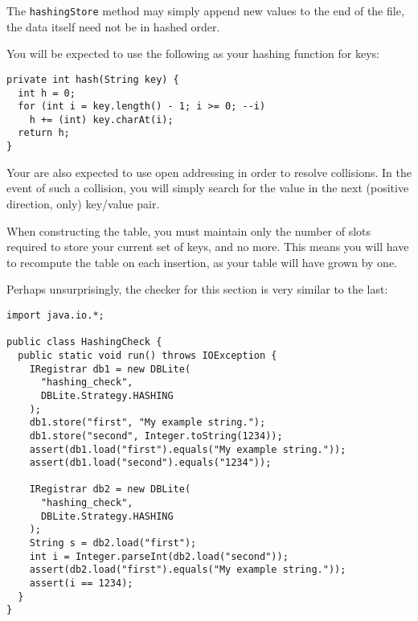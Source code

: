 \documentclass{article}
\begin{document}
The \texttt{hashingStore} method may simply append new values to the end of the
file, the data itself need not be in hashed order.

You will be expected to use the following as your hashing function for keys:

\begin{verbatim}
private int hash(String key) {
  int h = 0;
  for (int i = key.length() - 1; i >= 0; --i)
    h += (int) key.charAt(i);
  return h;
}
\end{verbatim}

Your are also expected to use open addressing in order to resolve collisions.
In the event of such a collision, you will simply search for the value in the
next (positive direction, only) key/value pair.

When constructing the table, you must maintain only the number of slots
required to store your current set of keys, and no more.  This means you will
have to recompute the table on each insertion, as your table will have grown by
one.

Perhaps unsurprisingly, the checker for this section is very similar to the last:

\begin{verbatim}
import java.io.*;

public class HashingCheck {
  public static void run() throws IOException {
    IRegistrar db1 = new DBLite(
      "hashing_check",
      DBLite.Strategy.HASHING
    );
    db1.store("first", "My example string.");
    db1.store("second", Integer.toString(1234));
    assert(db1.load("first").equals("My example string."));
    assert(db1.load("second").equals("1234"));

    IRegistrar db2 = new DBLite(
      "hashing_check",
      DBLite.Strategy.HASHING
    );
    String s = db2.load("first");
    int i = Integer.parseInt(db2.load("second"));
    assert(db2.load("first").equals("My example string."));
    assert(i == 1234);
  }
}
\end{verbatim}
\end{document}
